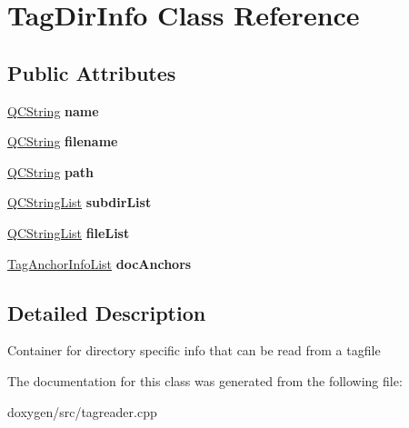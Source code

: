 \hypertarget{class_tag_dir_info}{}\section{Tag\+Dir\+Info Class Reference}
\label{class_tag_dir_info}
\subsection*{Public Attributes}
\begin{DoxyCompactItemize}
\item 
\mbox{\label{class_tag_dir_info_a5cfeefe508646d16441497e8fedf5781}} 
\mbox{\hyperlink{class_q_c_string}{Q\+C\+String}} {\bfseries name}
\item 
\mbox{\label{class_tag_dir_info_aa23bec9b1cf39df5803c6d6d2a8a4023}} 
\mbox{\hyperlink{class_q_c_string}{Q\+C\+String}} {\bfseries filename}
\item 
\mbox{\label{class_tag_dir_info_a55aa3de3e3bfdd5dbf01f59356459ccd}} 
\mbox{\hyperlink{class_q_c_string}{Q\+C\+String}} {\bfseries path}
\item 
\mbox{\label{class_tag_dir_info_ac3717108c5aaf41609b66545f290111e}} 
\mbox{\hyperlink{class_q_c_string_list}{Q\+C\+String\+List}} {\bfseries subdir\+List}
\item 
\mbox{\label{class_tag_dir_info_af2bb6c2e00fa17f03bccd9a51116eeca}} 
\mbox{\hyperlink{class_q_c_string_list}{Q\+C\+String\+List}} {\bfseries file\+List}
\item 
\mbox{\label{class_tag_dir_info_af9cee7f9aab8052dcfae09a6c04cbbe1}} 
\mbox{\hyperlink{class_tag_anchor_info_list}{Tag\+Anchor\+Info\+List}} {\bfseries doc\+Anchors}
\end{DoxyCompactItemize}


\subsection{Detailed Description}
Container for directory specific info that can be read from a tagfile 

The documentation for this class was generated from the following file\+:\begin{DoxyCompactItemize}
\item 
doxygen/src/tagreader.\+cpp\end{DoxyCompactItemize}
